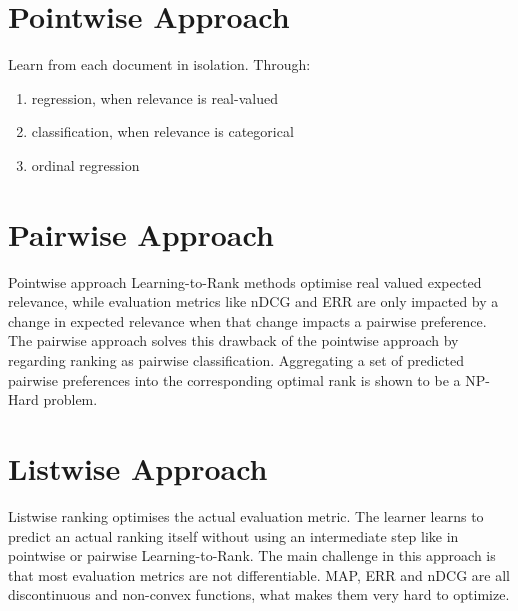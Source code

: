 \section{Pointwise Approach}
Learn from each document in isolation.
Through:
	\begin{enumerate}
	\item regression, when relevance is real-valued
	\item classification, when relevance is categorical
	\item ordinal regression
	\end{enumerate}
\section{Pairwise Approach}
Pointwise approach Learning-to-Rank methods optimise real valued expected relevance, while evaluation metrics like \ac{nDCG} and \ac{ERR} are only impacted by a change in expected relevance when that change impacts a pairwise preference. The pairwise approach solves this drawback of the pointwise approach by regarding ranking as pairwise classification. Aggregating a set of predicted pairwise preferences into the corresponding optimal rank is shown to be a NP-Hard problem. 
\section{Listwise Approach}
Listwise ranking optimises the actual evaluation metric. The learner learns to predict an actual ranking itself without using an intermediate step like in pointwise or pairwise Learning-to-Rank. The main challenge in this approach is that most evaluation metrics are not differentiable. \ac{MAP}, \ac{ERR} and \ac{nDCG} are all discontinuous and non-convex functions, what makes them very hard to optimize.
